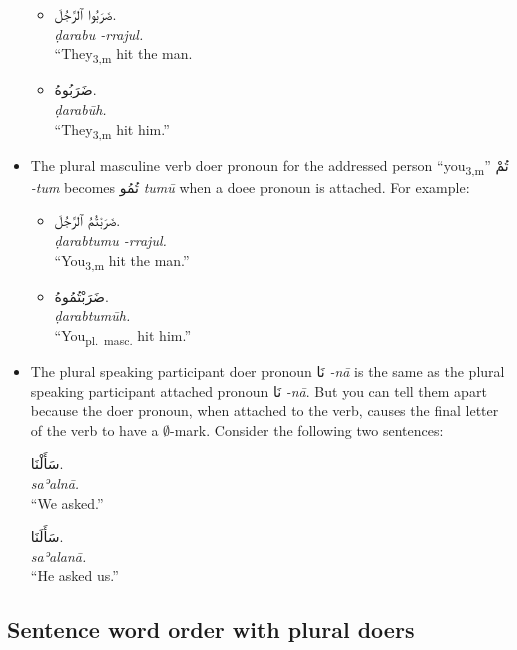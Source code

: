 \documentclass[
  10pt,
]{book}
\providecommand{\tightlist}{%
  \setlength{\itemsep}{0pt}\setlength{\parskip}{0pt}}
\begin{document}
\begin{itemize}
  \begin{itemize}
  \tightlist
  \item
    \foreignlanguage{arabic}{ضَرَبُوا ٱلرَّجُلَ.}\\
    \emph{ḍarabu -rrajul.}\\
    ``They\textsubscript{3,m} hit the man.
  \item
    \foreignlanguage{arabic}{ضَرَبُوهُ.}\\
    \emph{ḍarabūh.}\\
    \enquote{They\textsubscript{3,m} hit him.}
  \end{itemize}
\item
  The plural masculine verb doer pronoun for the addressed person \enquote{you\textsubscript{3,m}} \foreignlanguage{arabic}{تُمْ} \emph{-tum} becomes \foreignlanguage{arabic}{تُمُو} \emph{tumū} when a doee pronoun is attached. For example:

  \begin{itemize}
  \tightlist
  \item
    \foreignlanguage{arabic}{ضَرَبْتُمُ ٱلرَّجُلَ.}\\
    \emph{ḍarabtumu -rrajul.}\\
    \enquote{You\textsubscript{3,m} hit the man.}
  \item
    \foreignlanguage{arabic}{ضَرَبْتُمُوهُ.}\\
    \emph{ḍarabtumūh.}\\
    \enquote{You\textsubscript{pl.~masc.} hit him.}
  \end{itemize}
\item
  The plural speaking participant doer pronoun \foreignlanguage{arabic}{نَا} \emph{-nā} is the same as the plural speaking participant attached pronoun \foreignlanguage{arabic}{نَا} \emph{-nā}. But you can tell them apart because the doer pronoun, when attached to the verb, causes the final letter of the verb to have a \(\emptyset\)-mark. Consider the following two sentences:

  \foreignlanguage{arabic}{سَأَلْنَا.}\\
  \emph{saʾalnā.}\\
  \enquote{We asked.}

  \foreignlanguage{arabic}{سَأَلَنَا.}\\
  \emph{saʾalanā.}\\
  \enquote{He asked us.}
\end{itemize}

\subsection{Sentence word order with plural doers}\label{sentence-word-order-with-plural-doers}
\end{document}
